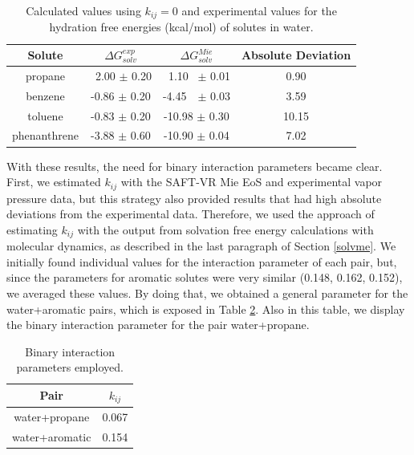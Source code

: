 \documentclass[
	12pt,				%
	openany,			%
	oneside,			%
	a4paper,			%
	english,			%
	brazil				%
	]{abntex2}
\begin{document}
\begin{table}[h]
	\centering
	\caption{Calculated values using $k_{ij}=0$ and experimental values for the hydration free energies (kcal/mol) of solutes in water.}
	\label{tbl:solv3}
	\begin{tabular}{cccc}
		\hline\hline
		Solute       & $\Delta G_{solv}^{exp}$ & $\Delta G_{solv}^{Mie}$ & Absolute Deviation \\ \hline\hline
		propane      & $\,$ 2.00 $\pm$ 0.20         & $\,$ 1.10 $\,$ $\pm$ 0.01         & 0.90               \\
		benzene      & -0.86 $\pm$ 0.20        & -4.45 $\, \,$ $\pm$ 0.03        & 3.59               \\
		toluene      & -0.83 $\pm$ 0.20        & -10.98 $\pm$ 0.30       & 10.15              \\
		phenanthrene & -3.88 $\pm$ 0.60        & -10.90 $\pm$ 0.04       & 7.02               \\ \hline\hline
	\end{tabular}
\end{table}
\FloatBarrier

With these results, the need for binary interaction parameters became clear. First, we estimated $k_{ij}$ with the SAFT-VR Mie EoS and experimental vapor pressure data, but this strategy also provided results that had high absolute deviations from the experimental data. Therefore, we used the approach of estimating $k_{ij}$ with the output from solvation free energy calculations with molecular dynamics, as described in the last paragraph of Section \ref{solvme}.  We initially found individual values for the interaction parameter of each pair, but, since the parameters for aromatic solutes were very similar (0.148, 0.162, 0.152), we averaged these values. By doing that,  we obtained a general parameter for the water+aromatic pairs, which is exposed in Table \ref{tbl:kij}. Also in this table, we display the binary interaction parameter for the pair water+propane. 

\begin{table}[h]
	\centering
	\caption{Binary interaction parameters employed.}
	\label{tbl:kij}
	\begin{tabular}{cc}
		\hline
		\hline
		Pair & $k_{ij}$ \\
		\hline\hline
		water+propane      & 0.067  \\
		water+aromatic      & 0.154 \\  
		\hline
		\hline
	\end{tabular}
\end{table}
\end{document}
